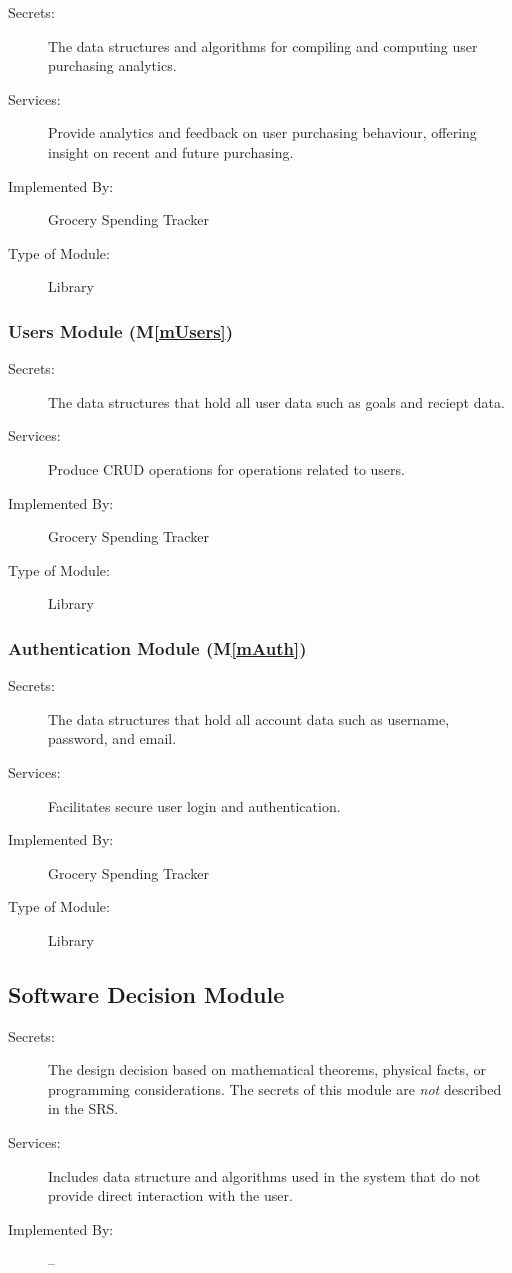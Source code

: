 \documentclass[12pt, titlepage]{article}
\newcommand{\mref}[1]{M\ref{#1}}
\begin{document}
\begin{description}
\item[Secrets:] The data structures and algorithms for compiling and computing user purchasing analytics. 
\item[Services:] Provide analytics and feedback on user purchasing behaviour, offering insight on recent and future purchasing.
\item[Implemented By:] Grocery Spending Tracker
\item[Type of Module:] Library
\end{description}

\subsubsection{Users Module (\mref{mUsers})}

\begin{description}
\item[Secrets:] The data structures that hold all user data such as goals and reciept data.
\item[Services:] Produce CRUD operations for operations related to users.
\item[Implemented By:] Grocery Spending Tracker
\item[Type of Module:] Library
\end{description}

\subsubsection{Authentication Module (\mref{mAuth})}

\begin{description}
\item[Secrets:] The data structures that hold all account data such as username, password, and email.
\item[Services:] Facilitates secure user login and authentication.
\item[Implemented By:] Grocery Spending Tracker
\item[Type of Module:] Library
\end{description}

\subsection{Software Decision Module}

\begin{description}
\item[Secrets:] The design decision based on mathematical theorems, physical
  facts, or programming considerations. The secrets of this module are
  \emph{not} described in the SRS.
\item[Services:] Includes data structure and algorithms used in the system that
  do not provide direct interaction with the user. 
\item[Implemented By:] --
\end{description}
\end{document}
